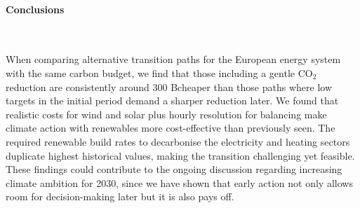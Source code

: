 \documentclass[5p]{elsarticle} %
\begin{document}
\paragraph{\textbf{Conclusions}} \

When comparing alternative transition paths for the European energy system with the same carbon budget, we find that those including a gentle CO$_2$ reduction are consistently around 300 B\EUR cheaper than those paths where low targets in the initial period demand a sharper reduction later.  We found that realistic costs for wind and solar plus hourly resolution for balancing make climate action with renewables more cost-effective than previously seen. The required renewable build rates to decarbonise the electricity and heating sectors duplicate highest historical values, making the transition challenging yet feasible. These findings could contribute to the ongoing discussion regarding increasing climate ambition for 2030, since we have shown that early action not only allows room for decision-making later but it is also pays off.  


\end{document}
